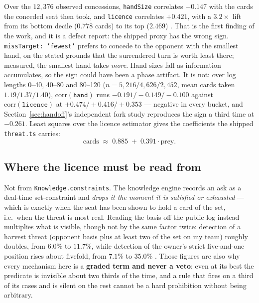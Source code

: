 \documentclass[11pt]{article}
\newcommand{\code}[1]{\texttt{#1}}
\begin{document}
Over the $12{,}376$ observed concessions, \code{handSize} correlates $\mathbf{-0.147}$ with the
cards the conceded seat then took, and \code{licence} correlates $\mathbf{+0.421}$, with a
$3.2\times$ lift from its bottom decile ($0.778$ cards) to its top ($2.469$) \cite{concession}. That
is the first finding of the work, and it is a defect report: the shipped proxy has the wrong sign.
\code{missTarget: 'fewest'} prefers to concede to the opponent with the smallest hand, on the stated
grounds that the surrendered turn is worth least there; measured, the smallest hand takes
\emph{more}. Hand sizes fall as information accumulates, so the sign could have been a phase
artifact. It is not: over log lengths 0--40, 40--80 and 80--120 ($n = 5{,}216 / 4{,}626 / 2{,}452$,
mean cards taken $1.19 / 1.37 / 1.40$), $\mathrm{corr}(\code{hand})$ runs $-0.191 / -0.149 / -0.100$
against $\mathrm{corr}(\code{licence})$ at $+0.474 / +0.416 / +0.353$ --- negative in every bucket,
and Section~\ref{sec:handoff}'s independent fork study reproduces the sign a third time at $-0.261$.
Least squares over the licence estimator gives the coefficients the shipped \code{threat.ts}
carries:
\begin{equation}
\label{eq:threat}
\text{cards} \;\approx\; 0.885 \;+\; 0.391 \cdot \text{prey}.
\end{equation}

\subsection{Where the licence must be read from}
\label{sec:licence}

Not from \code{Knowledge.constraints}. The knowledge engine records an ask as a deal-time
set-constraint and \emph{drops it the moment it is satisfied or exhausted} --- which is exactly when
the seat has been shown to hold a card of the set, i.e.\ when the threat is most real. Reading the
basis off the public log instead multiplies what is visible, though not by the same factor twice:
detection of a harvest threat (opponent basis plus at least two of the set on my team) roughly
doubles, from $6.0\%$ to $\mathbf{11.7\%}$, while detection of the owner's strict five-and-one
position rises about fivefold, from $7.1\%$ to $\mathbf{35.0\%}$ \cite{concession}. Those figures are also why every mechanism here is a \textbf{graded term and
never a veto}: even at its best the predicate is invisible about two thirds of the time, and a rule
that fires on a third of its cases and is silent on the rest cannot be a hard prohibition without
being arbitrary.
\end{document}
